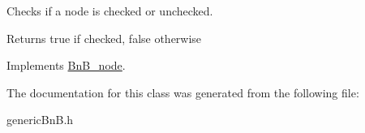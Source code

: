 Checks if a node is checked or unchecked. 

\begin{DoxyReturn}{Returns}
true if checked, false otherwise 
\end{DoxyReturn}


Implements \hyperlink{class_bn_b__node_ae59aee037f8c7c88b9b63948e7b5d8cb}{Bn\+B\+\_\+node}.



The documentation for this class was generated from the following file\+:\begin{DoxyCompactItemize}
\item 
generic\+Bn\+B.\+h\end{DoxyCompactItemize}
